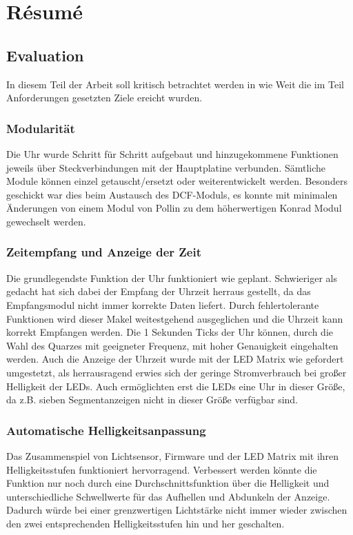 \section{Résumé}
\subsection{Evaluation}
In diesem Teil der Arbeit soll kritisch betrachtet werden in wie Weit die im
Teil Anforderungen gesetzten Ziele ereicht wurden.
\subsubsection{Modularität}
Die Uhr wurde Schritt für Schritt aufgebaut und hinzugekommene Funktionen
jeweils über Steckverbindungen mit der Hauptplatine verbunden. Sämtliche Module können
einzel getauscht/ersetzt oder weiterentwickelt werden. Besonders geschickt war
dies beim Austausch des DCF-Moduls, es konnte mit minimalen Änderungen von einem
Modul von Pollin zu dem höherwertigen Konrad Modul gewechselt werden. 
\subsubsection{Zeitempfang und Anzeige der Zeit}
Die grundlegendste Funktion der Uhr funktioniert wie geplant. Schwieriger als
gedacht hat sich dabei der Empfang der Uhrzeit herraus gestellt, da das
Empfangsmodul nicht immer korrekte Daten liefert. Durch fehlertolerante
Funktionen wird dieser Makel weitestgehend ausgeglichen und die Uhrzeit kann
korrekt Empfangen werden. Die 1 Sekunden Ticks der Uhr können, durch die Wahl
des Quarzes mit geeigneter Frequenz, mit hoher Genauigkeit eingehalten werden.
Auch die Anzeige der Uhrzeit wurde mit der LED Matrix wie gefordert umgestetzt,
als herrausragend erwies sich der geringe Stromverbrauch bei großer Helligkeit
der LEDs. Auch ermöglichten erst die LEDs eine Uhr in dieser Größe, da z.B.
sieben Segmentanzeigen nicht in dieser Größe verfügbar sind.

\subsubsection{Automatische Helligkeitsanpassung}
Das Zusammenspiel von Lichtsensor, Firmware und der LED Matrix mit ihren
Helligkeitsstufen funktioniert hervorragend. Verbessert werden könnte die
Funktion nur noch durch eine Durchschnittsfunktion über die Helligkeit und
unterschiedliche Schwellwerte für das Aufhellen und Abdunkeln der
Anzeige. Dadurch würde bei einer grenzwertigen Lichtstärke
nicht immer wieder zwischen den zwei entsprechenden Helligkeitsstufen hin und
her geschalten.
